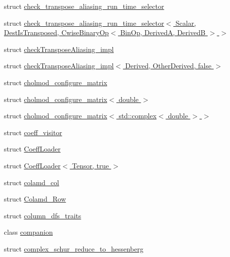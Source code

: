 \begin{DoxyCompactItemize}
\item 
struct \hyperlink{struct_eigen_1_1internal_1_1check__transpose__aliasing__run__time__selector}{check\+\_\+transpose\+\_\+aliasing\+\_\+run\+\_\+time\+\_\+selector}
\item 
struct \hyperlink{struct_eigen_1_1internal_1_1check__transpose__aliasing__run__time__selector_3_01_scalar_00_01_de23c75dd073d34cd03e0a4d86706317fc}{check\+\_\+transpose\+\_\+aliasing\+\_\+run\+\_\+time\+\_\+selector$<$ Scalar, Dest\+Is\+Transposed, Cwise\+Binary\+Op$<$ Bin\+Op, Derived\+A, Derived\+B $>$ $>$}
\item 
struct \hyperlink{struct_eigen_1_1internal_1_1check_transpose_aliasing__impl}{check\+Transpose\+Aliasing\+\_\+impl}
\item 
struct \hyperlink{struct_eigen_1_1internal_1_1check_transpose_aliasing__impl_3_01_derived_00_01_other_derived_00_01false_01_4}{check\+Transpose\+Aliasing\+\_\+impl$<$ Derived, Other\+Derived, false $>$}
\item 
struct \hyperlink{struct_eigen_1_1internal_1_1cholmod__configure__matrix}{cholmod\+\_\+configure\+\_\+matrix}
\item 
struct \hyperlink{struct_eigen_1_1internal_1_1cholmod__configure__matrix_3_01double_01_4}{cholmod\+\_\+configure\+\_\+matrix$<$ double $>$}
\item 
struct \hyperlink{struct_eigen_1_1internal_1_1cholmod__configure__matrix_3_01std_1_1complex_3_01double_01_4_01_4}{cholmod\+\_\+configure\+\_\+matrix$<$ std\+::complex$<$ double $>$ $>$}
\item 
struct \hyperlink{struct_eigen_1_1internal_1_1coeff__visitor}{coeff\+\_\+visitor}
\item 
struct \hyperlink{struct_eigen_1_1internal_1_1_coeff_loader}{Coeff\+Loader}
\item 
struct \hyperlink{struct_eigen_1_1internal_1_1_coeff_loader_3_01_tensor_00_01true_01_4}{Coeff\+Loader$<$ Tensor, true $>$}
\item 
struct \hyperlink{struct_eigen_1_1internal_1_1colamd__col}{colamd\+\_\+col}
\item 
struct \hyperlink{struct_eigen_1_1internal_1_1_colamd___row}{Colamd\+\_\+\+Row}
\item 
struct \hyperlink{struct_eigen_1_1internal_1_1column__dfs__traits}{column\+\_\+dfs\+\_\+traits}
\item 
class \hyperlink{class_eigen_1_1internal_1_1companion}{companion}
\item 
struct \hyperlink{struct_eigen_1_1internal_1_1complex__schur__reduce__to__hessenberg}{complex\+\_\+schur\+\_\+reduce\+\_\+to\+\_\+hessenberg}

\end{DoxyCompactItemize}
